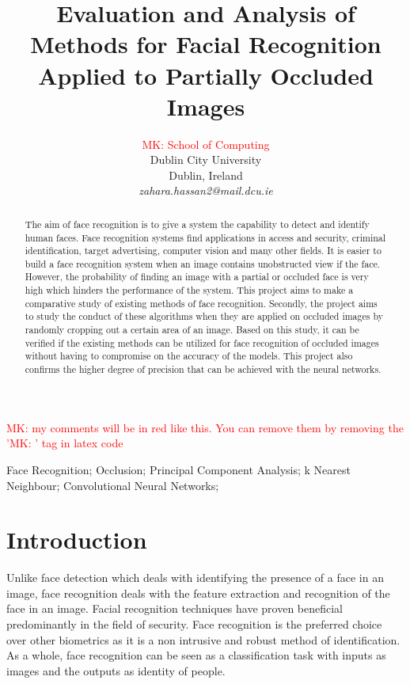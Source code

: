 \documentclass[conference]{IEEEtran}
\newcommand{\MK}[1]{\textcolor{red}{MK: #1}}  %
\begin{document}
\title{Evaluation and Analysis of Methods for Facial Recognition Applied to Partially Occluded Images}

\author{
\MK{School of Computing}\\
Dublin City University\\
Dublin, Ireland \\
\textit{zahara.hassan2@mail.dcu.ie
}}

\maketitle

\MK{my comments will be in red like this. You can remove them by removing the '\MK' tag in latex code}

\begin{abstract}
The aim of face recognition is to give a system the capability to detect and identify human faces. Face recognition systems find applications in access and security, criminal identification, target advertising, computer vision and many other fields. It is easier to build a face recognition system when an image contains unobstructed view if the face. However, the probability of finding an image with a partial or occluded face is very high which hinders the performance of the system. This project aims to make a comparative study of existing methods of face recognition. Secondly, the project aims to study the conduct of these algorithms when they are applied on occluded images by randomly cropping out a certain area of an image. Based on this study, it can be verified if the existing methods can be utilized for face recognition of occluded images without having to compromise on the accuracy of the models. This project also confirms the higher degree of precision that can be achieved with the neural networks.

\end{abstract}

\begin{IEEEkeywords}
Face Recognition; Occlusion; Principal Component Analysis; k Nearest Neighbour; Convolutional Neural Networks;

\end{IEEEkeywords}

\section{Introduction}
\label{sec: 1.introduction}
Unlike face detection which deals with identifying the presence of a face in an image, face recognition deals with the feature extraction and recognition of the face in an image. Facial recognition techniques have proven beneficial predominantly in the field of security. Face recognition is the preferred choice over other biometrics as it is a non intrusive and robust method of identification. As a whole, face recognition can be seen as a classification task with inputs as images and the outputs as identity of people. 
\end{document}
